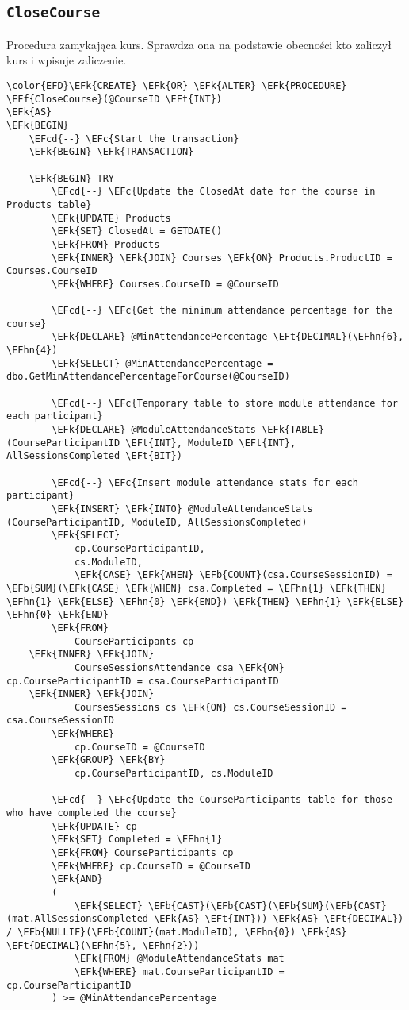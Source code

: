 \documentclass[11pt]{article}
\newcommand{\EFc}[1]{\textcolor{EFc}{\textit{#1}}} %
\newcommand{\EFcd}[1]{\textcolor{EFcd}{\textit{#1}}} %
\newcommand{\EFk}[1]{\textcolor{EFk}{\textbf{#1}}} %
\newcommand{\EFb}[1]{\textcolor{EFb}{\textbf{#1}}} %
\newcommand{\EFf}[1]{\textcolor{EFf}{#1}} %
\newcommand{\EFt}[1]{\textcolor{EFt}{\textbf{#1}}} %
\newcommand{\EFhn}[1]{\textcolor{EFhn}{#1}} %
\begin{document}
\subsection{\texttt{CloseCourse}}
\label{sec:org36028c0}
Procedura zamykająca kurs. Sprawdza ona na podstawie obecności kto zaliczył kurs i wpisuje zaliczenie.
\begin{Code}
\begin{Verbatim}
\color{EFD}\EFk{CREATE} \EFk{OR} \EFk{ALTER} \EFk{PROCEDURE} \EFf{CloseCourse}(@CourseID \EFt{INT})
\EFk{AS}
\EFk{BEGIN}
    \EFcd{--} \EFc{Start the transaction}
    \EFk{BEGIN} \EFk{TRANSACTION}

    \EFk{BEGIN} TRY
        \EFcd{--} \EFc{Update the ClosedAt date for the course in Products table}
        \EFk{UPDATE} Products
        \EFk{SET} ClosedAt = GETDATE()
        \EFk{FROM} Products
        \EFk{INNER} \EFk{JOIN} Courses \EFk{ON} Products.ProductID = Courses.CourseID
        \EFk{WHERE} Courses.CourseID = @CourseID

        \EFcd{--} \EFc{Get the minimum attendance percentage for the course}
        \EFk{DECLARE} @MinAttendancePercentage \EFt{DECIMAL}(\EFhn{6}, \EFhn{4})
        \EFk{SELECT} @MinAttendancePercentage = dbo.GetMinAttendancePercentageForCourse(@CourseID)

        \EFcd{--} \EFc{Temporary table to store module attendance for each participant}
        \EFk{DECLARE} @ModuleAttendanceStats \EFk{TABLE} (CourseParticipantID \EFt{INT}, ModuleID \EFt{INT}, AllSessionsCompleted \EFt{BIT})

        \EFcd{--} \EFc{Insert module attendance stats for each participant}
        \EFk{INSERT} \EFk{INTO} @ModuleAttendanceStats (CourseParticipantID, ModuleID, AllSessionsCompleted)
        \EFk{SELECT} 
            cp.CourseParticipantID,
            cs.ModuleID,
            \EFk{CASE} \EFk{WHEN} \EFb{COUNT}(csa.CourseSessionID) = \EFb{SUM}(\EFk{CASE} \EFk{WHEN} csa.Completed = \EFhn{1} \EFk{THEN} \EFhn{1} \EFk{ELSE} \EFhn{0} \EFk{END}) \EFk{THEN} \EFhn{1} \EFk{ELSE} \EFhn{0} \EFk{END}
        \EFk{FROM} 
            CourseParticipants cp
    \EFk{INNER} \EFk{JOIN} 
            CourseSessionsAttendance csa \EFk{ON} cp.CourseParticipantID = csa.CourseParticipantID
    \EFk{INNER} \EFk{JOIN} 
            CoursesSessions cs \EFk{ON} cs.CourseSessionID = csa.CourseSessionID
        \EFk{WHERE} 
            cp.CourseID = @CourseID
        \EFk{GROUP} \EFk{BY} 
            cp.CourseParticipantID, cs.ModuleID

        \EFcd{--} \EFc{Update the CourseParticipants table for those who have completed the course}
        \EFk{UPDATE} cp
        \EFk{SET} Completed = \EFhn{1}
        \EFk{FROM} CourseParticipants cp
        \EFk{WHERE} cp.CourseID = @CourseID
        \EFk{AND} 
        (
            \EFk{SELECT} \EFb{CAST}(\EFb{CAST}(\EFb{SUM}(\EFb{CAST}(mat.AllSessionsCompleted \EFk{AS} \EFt{INT})) \EFk{AS} \EFt{DECIMAL}) / \EFb{NULLIF}(\EFb{COUNT}(mat.ModuleID), \EFhn{0}) \EFk{AS} \EFt{DECIMAL}(\EFhn{5}, \EFhn{2}))
            \EFk{FROM} @ModuleAttendanceStats mat
            \EFk{WHERE} mat.CourseParticipantID = cp.CourseParticipantID
        ) >= @MinAttendancePercentage


\end{Verbatim}
\end{Code}
\end{document}
